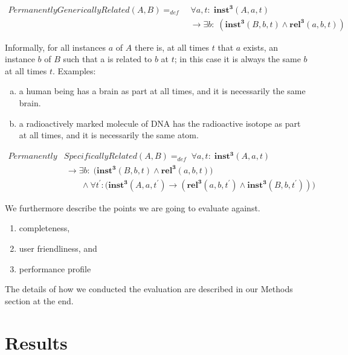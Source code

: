 \documentclass[10pt]{bmc_article}
\newcommand{\mirel}[1]{\ensuremath{\mathrm{\mathbf{#1}}}}
\newcommand{\mclass}[1]{\ensuremath{\mathit{#1}}}
\newcommand{\mrel}[2]{\mirel{#1^#2}}
\newcommand{\mrelt}[1]{\mrel{#1}{3}}
\newenvironment{bmcformat}{\baselineskip20pt\sloppy\setboolean{publ}{false}}{\baselineskip20pt\sloppy}
\begin{document}
\begin{bmcformat}
\begin{equation}
\begin{split}
\mclass{PermanentlyGenericallyRelated}(\mclass{A},\mclass{B}) =_{def}&\;
\forall a, t:\; \mrelt{inst}(\mclass{A}, a, t) \\
&\ \rightarrow
\exists b:\;(\mrelt{inst}(\mclass{B},b,t) \wedge
\mrelt{rel}(a,b,t))
\end{split}
\label{eq:generically}
\end{equation}

Informally, for all instances $a$ of \mclass{A} there is, at all times $t$ that $a$ exists, an
instance $b$ of \mclass{B} such that a is related to $b$ at $t$; in this case it is always the
same $b$ at all times $t$. Examples:
\begin{enumerate}[(a)]
\item a human being has a brain as part at all times, and it is necessarily the same brain.
\item a radioactively marked molecule of DNA has the radioactive isotope as part
at all times, and it is necessarily the same atom.
\end{enumerate} 

\begin{equation}
\begin{split}
\mclass{Permanently}&\mclass{SpecificallyRelated}(\mclass{A},\mclass{B}) =_{def}\;
\forall a, t:\; \mrelt{inst}(\mclass{A}, a, t) \\
&\ \rightarrow 
\exists b:\;\big(\mrelt{inst}(\mclass{B},b,t) \wedge 
\mrelt{rel}(a,b,t))
\\
&\quad\quad \wedge \forall t^\prime: (\mrelt{inst}(\mclass{A},a,t^\prime)
\rightarrow (\mrelt{rel}(a,b,t^\prime) \wedge
\mrelt{inst}(\mclass{B},b,t^\prime))\big)
\end{split}
\label{eq:specifically}
\end{equation}


We furthermore describe the points we are going to evaluate against. 
\begin{enumerate}
	\item completeness, 
	\item user friendliness, and 
	\item performance profile
\end{enumerate}
The details of how we conducted the evaluation are described in our Methods section at the end. 


\section*{Results}


\end{bmcformat}
\end{document}
